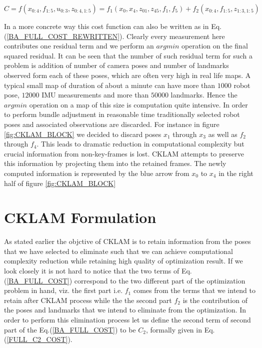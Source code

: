 \begin{equation}
  C = f(x_{0:4}, f_{1:5}, u_{0:3}, z_{0:4, 1:5}) = f_1(x_0, x_4, z_{01}, z_{45}, f_1, f_5) + f_2(x_{0:4}, f_{1:5}, z_{1:3, 1:5})
  \label{BA_FULL_COST}
\end{equation}

In a more concrete way this cost function can also be written as in Eq.(\ref{BA_FULL_COST_REWRITTEN}). Clearly every measurement here contributes one residual term and we perform an $argmin$ operation on the final squared residual. It can be seen that the number of such residual term for such a problem is addition of number of camera poses and number of landmarks observed form each of these poses, which are often very high in real life maps. A typical small map of duration of about a minute can have more than $1000$ robot pose, $12000$ IMU measurements and more than $50000$ landmarks. Hence the $argmin$ operation on a map of this size is computation quite intensive. In order to perform bundle adjustment in reasonable time traditionally selected robot poses and associated observations are discarded. For instance in figure \ref{fig:CKLAM_BLOCK} we decided to discard poses $x_1$ through $x_3$ as well as $f_2$ through $f_4$. This leads to dramatic reduction in computational complexity but crucial information from non-key-frames is lost. CKLAM attempts to preserve this information by projecting them into the retained frames. The newly computed information is represented by the blue arrow from $x_0$ to $x_4$ in the right half of figure \ref{fig:CKLAM_BLOCK}

\section{CKLAM Formulation}
As stated earlier the objctive of CKLAM is to retain information from the poses that we have selected to eliminate such that we can achieve computational complexity reduction while retaining high quality of optimization result. If we look closely it is not hard to notice that the two terms of Eq.(\ref{BA_FULL_COST}) correspond to the two different part of the optimization problem in hand, viz. the first part i.e. $f_1$ comes from the terms that we intend to retain after CKLAM process while the the second part $f_2$ is the contribution of the poses and landmarks that we intend to eliminate from the optimization. In order to perform this elimination process let us define the second term of second part of the Eq.(\ref{BA_FULL_COST}) to be $C_2$, formally given in Eq. (\ref{FULL_C2_COST}). 

